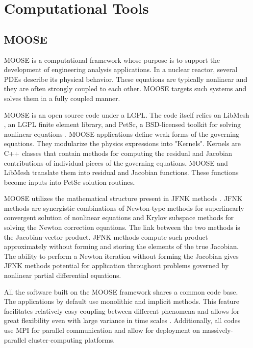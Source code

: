 \documentclass[11pt,letterpaper]{article}
\begin{document}
\section{Computational Tools}

\subsection{MOOSE}

\gls{MOOSE}\cite{gaston_moose_2009} is a computational framework whose purpose is to support the development of engineering analysis applications.
In a nuclear reactor, several \glspl{PDE} describe its physical behavior.
These equations are typically nonlinear and they are often strongly coupled to each other.
\gls{MOOSE} targets such systems and solves them in a fully coupled manner.

\gls{MOOSE} is an open source code under a \gls{LGPL}.
The code itself relies on LibMesh \cite{kirk_libmesh_2006}, an LGPL finite element library, and PetSc, a \gls{BSD}-licensed toolkit for solving nonlinear equations \cite{balay_petsc_2016}.
MOOSE applications define weak forms of the governing equations.
They modularize the physics expressions into "Kernels".
Kernels are C++ classes that contain methods for computing the residual and Jacobian contributions of individual pieces of the governing equations.
\gls{MOOSE} and LibMesh translate them into residual and Jacobian functions.
These functions become inputs into PetSc solution routines.

\gls{MOOSE} utilizes the mathematical structure present in \gls{JFNK} methods \cite{knoll_jacobian-free_2004}.
\gls{JFNK} methods are synergistic combinations of Newton-type methods for superlinearly convergent solution of nonlinear equations and Krylov subspace methods for solving the Newton correction equations.
The link between the two methods is the Jacobian-vector product.
\gls{JFNK} methods compute such product approximately without forming and storing the elements of the true Jacobian.
The ability to perform a Newton iteration without forming the Jacobian gives \gls{JFNK} methods potential for application throughout problems governed by nonlinear partial differential equations.

All the software built on the \gls{MOOSE} framework shares a common code base.
The applications by default use monolithic and implicit methods.
This feature facilitates relatively easy coupling between different phenomena and allows for great flexibility even with large variance in time scales \cite{novak_pronghorn_2018}.
Additionally, all codes use MPI for parallel communication and allow for deployment on massively-parallel cluster-computing platforms.
\end{document}
